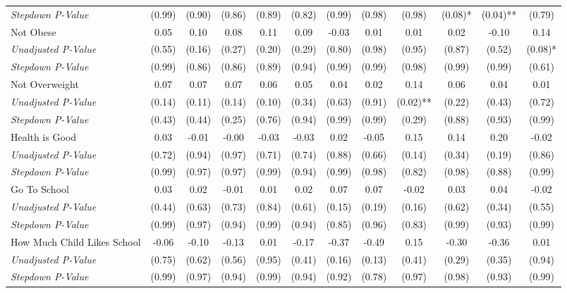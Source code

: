 \begin{tabular}{l c c c c c c c c c c c}
\quad \textit{Stepdown P-Value} & (0.99) & (0.90) & (0.86) & (0.89) & (0.82) & (0.99) & (0.98) & (0.98) & (0.08)* & (0.04)** & (0.79) \\
Not Obese & 0.05 & 0.10 & 0.08 & 0.11 & 0.09 & -0.03 & 0.01 & 0.01 & 0.02 & -0.10 & 0.14 \\
\quad \textit{Unadjusted P-Value} & (0.55) & (0.16) & (0.27) & (0.20) & (0.29) & (0.80) & (0.98) & (0.95) & (0.87) & (0.52) & (0.08)* \\
\quad \textit{Stepdown P-Value} & (0.99) & (0.86) & (0.86) & (0.89) & (0.94) & (0.99) & (0.99) & (0.98) & (0.99) & (0.99) & (0.61) \\
Not Overweight & 0.07 & 0.07 & 0.07 & 0.06 & 0.05 & 0.04 & 0.02 & 0.14 & 0.06 & 0.04 & 0.01 \\
\quad \textit{Unadjusted P-Value} & (0.14) & (0.11) & (0.14) & (0.10) & (0.34) & (0.63) & (0.91) & (0.02)** & (0.22) & (0.43) & (0.72) \\
\quad \textit{Stepdown P-Value} & (0.43) & (0.44) & (0.25) & (0.76) & (0.94) & (0.99) & (0.99) & (0.29) & (0.88) & (0.93) & (0.99) \\
Health is Good & 0.03 & -0.01 & -0.00 & -0.03 & -0.03 & 0.02 & -0.05 & 0.15 & 0.14 & 0.20 & -0.02 \\
\quad \textit{Unadjusted P-Value} & (0.72) & (0.94) & (0.97) & (0.71) & (0.74) & (0.88) & (0.66) & (0.14) & (0.34) & (0.19) & (0.86) \\
\quad \textit{Stepdown P-Value} & (0.99) & (0.97) & (0.97) & (0.99) & (0.94) & (0.99) & (0.98) & (0.82) & (0.98) & (0.88) & (0.99) \\
Go To School & 0.03 & 0.02 & -0.01 & 0.01 & 0.02 & 0.07 & 0.07 & -0.02 & 0.03 & 0.04 & -0.02 \\
\quad \textit{Unadjusted P-Value} & (0.44) & (0.63) & (0.73) & (0.84) & (0.61) & (0.15) & (0.19) & (0.16) & (0.62) & (0.34) & (0.55) \\
\quad \textit{Stepdown P-Value} & (0.99) & (0.97) & (0.94) & (0.99) & (0.94) & (0.85) & (0.96) & (0.83) & (0.99) & (0.93) & (0.99) \\
How Much Child Likes School & -0.06 & -0.10 & -0.13 & 0.01 & -0.17 & -0.37 & -0.49 & 0.15 & -0.30 & -0.36 & 0.01 \\
\quad \textit{Unadjusted P-Value} & (0.75) & (0.62) & (0.56) & (0.95) & (0.41) & (0.16) & (0.13) & (0.41) & (0.29) & (0.35) & (0.94) \\
\quad \textit{Stepdown P-Value} & (0.99) & (0.97) & (0.94) & (0.99) & (0.94) & (0.92) & (0.78) & (0.97) & (0.98) & (0.93) & (0.99) \\

\end{tabular}
